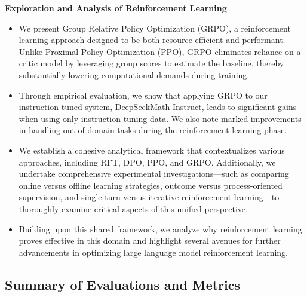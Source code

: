 \textbf{Exploration and Analysis of Reinforcement Learning}

\begin{itemize}[topsep=0pt]
    \item We present Group Relative Policy Optimization (GRPO), a reinforcement learning approach designed to be both resource-efficient and performant. Unlike Proximal Policy Optimization (PPO), GRPO eliminates reliance on a critic model by leveraging group scores to estimate the baseline, thereby substantially lowering computational demands during training.
    \item Through empirical evaluation, we show that applying GRPO to our instruction-tuned system, DeepSeekMath-Instruct, leads to significant gains when using only instruction-tuning data. We also note marked improvements in handling out-of-domain tasks during the reinforcement learning phase.
    \item We establish a cohesive analytical framework that contextualizes various approaches, including RFT, DPO, PPO, and GRPO. Additionally, we undertake comprehensive experimental investigations—such as comparing online versus offline learning strategies, outcome versus process-oriented supervision, and single-turn versus iterative reinforcement learning—to thoroughly examine critical aspects of this unified perspective.
    \item Building upon this shared framework, we analyze why reinforcement learning proves effective in this domain and highlight several avenues for further advancements in optimizing large language model reinforcement learning.
\end{itemize}

\subsection{Summary of Evaluations and Metrics}


